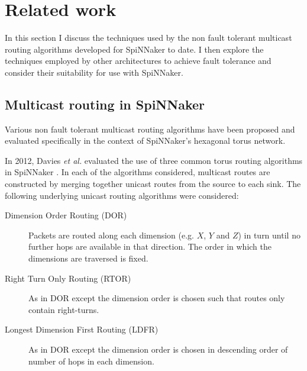 	\section{Related work}
		
		In this section I discuss the techniques used by the non fault tolerant
		multicast routing algorithms developed for SpiNNaker to date. I then
		explore the techniques employed by other architectures to achieve fault
		tolerance and consider their suitability for use with SpiNNaker.
		
		\subsection{Multicast routing in SpiNNaker}
			
			Various non fault tolerant multicast routing algorithms have been
			proposed and evaluated specifically in the context of SpiNNaker's
			hexagonal torus network.
			
			In 2012, Davies \emph{et al.} evaluated the use of three common torus
			routing algorithms in SpiNNaker \cite{davies12}. In each of the
			algorithms considered, multicast routes are constructed by merging
			together unicast routes from the source to each sink. The following
			underlying unicast routing algorithms were considered:
			
			\begin{description}
				
				\item[Dimension Order Routing (DOR)] Packets are routed along each
				dimension (e.g. $X$, $Y$ and $Z$) in turn until no further hops are
				available in that direction.  The order in which the dimensions are
				traversed is fixed.
				
				\item[Right Turn Only Routing (RTOR)] As in DOR except the dimension
				order is chosen such that routes only contain right-turns.
				
				\item[Longest Dimension First Routing (LDFR)] As in DOR except the
				dimension order is chosen in descending order of number of hops in each
				dimension.
				
			\end{description}
			

